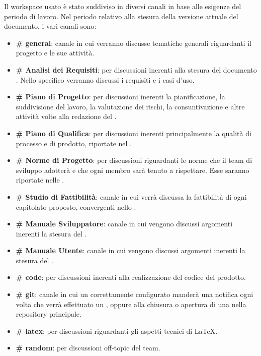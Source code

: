 			Il workspace usato è stato suddiviso in diversi canali in base alle esigenze del periodo di lavoro.
			Nel periodo relativo alla stesura della versione attuale del documento, i vari canali sono:
			\begin{itemize}
				\item \textbf{\# general}: canale in cui verranno discusse tematiche generali riguardanti il progetto e le sue attività.
				\item \textbf{\# Analisi dei Requisiti}: per discussioni inerenti alla stesura del documento \AdRd. Nello specifico verranno discussi i requisiti e i casi d'uso.
				\item \textbf{\# Piano di Progetto}: per discussioni inerenti la pianificazione, la suddivisione del lavoro, la valutazione dei rischi, la consuntivazione e altre attività volte alla redazione del \PdPd.
				\item \textbf{\# Piano di Qualifica}: per discussioni inerenti principalmente la qualità di processo e di prodotto, riportate nel \PdQd.
				\item \textbf{\# Norme di Progetto}: per discussioni riguardanti le norme che il team di sviluppo adotterà e che ogni membro sarà tenuto a rispettare. Esse saranno riportate nelle \NdP.
				\item \textbf{\# Studio di Fattibilità}: canale in cui verrà discussa la fattibilità di ogni capitolato proposto, convergenti nello \SdFd.
				\item \textbf{\# Manuale Sviluppatore}: canale in cui vengono discussi argomenti inerenti la stesura del \MSd.
				\item \textbf{\# Manuale Utente}: canale in cui vengono discussi argomenti inerenti la stesura del \MUd.
				\item \textbf{\# code}: per discussioni inerenti alla realizzazione del codice del prodotto.
				\item \textbf{\# git}: canale in cui un  correttamente configurato manderà una notifica ogni volta che verrà effettuato un , oppure alla chiusura o apertura di una  nella repository principale.
				\item \textbf{\# latex}: per discussioni riguardanti gli aspetti tecnici di \LaTeX.
				\item \textbf{\# random}: per discussioni off-topic del team.
			\end{itemize}

